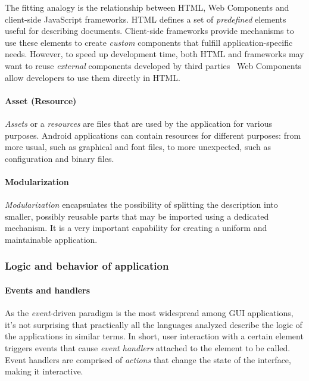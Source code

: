 The fitting analogy is the relationship between HTML, Web Components and client-side JavaScript frameworks.
HTML defines a set of \emph{predefined} elements useful for describing documents.
Client-side frameworks provide mechanisms to use these elements to create \emph{custom} components that fulfill application-specific needs.
However, to speed up development time, both HTML and frameworks may want to reuse \emph{external} components developed by third parties \textendash\ Web Components allow developers to use them directly in HTML\@.

\paragraph{Asset (Resource)}
\emph{Assets} or a \emph{resources} are files that are used by the application for various purposes.
Android applications can contain resources for different purposes: from more usual, such as graphical and font files, to more unexpected, such as configuration and binary files.

\paragraph{Modularization}
\emph{Modularization} encapsulates the possibility of splitting the description into smaller, possibly reusable parts that may be imported using a dedicated mechanism.
It is a very important capability for creating a uniform and maintainable application.

\subsubsection{Logic and behavior of application}

\paragraph{Events and handlers}
As the \emph{event}-driven paradigm is the most widespread among GUI applications, it's not surprising that practically all the languages analyzed describe the logic of the applications in similar terms.
In short, user interaction with a certain element triggers events that cause \emph{event handlers} attached to the element to be called.
Event handlers are comprised of \emph{actions} that change the state of the interface, making it interactive.

